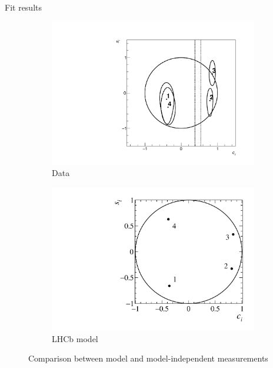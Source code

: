 \documentclass{beamer}
\begin{document}
\begin{frame}{Fit results}
  \begin{figure}
    \centering
    \begin{subfigure}{0.5\textwidth}
      \centering
      \includegraphics[width=1.0\textwidth]{Plots/Contours_cisi.pdf}
      \caption{Data}
    \end{subfigure}%
    \begin{subfigure}{0.5\textwidth}
      \centering
      \includegraphics[width=1.0\textwidth]{Plots/StrongPhaseParametersPlot_cisi_4Bins.pdf}
      \caption{LHCb model}
    \end{subfigure}
    \caption{Comparison between model and model-independent measurements}
  \end{figure}
\end{frame}
\end{document}
